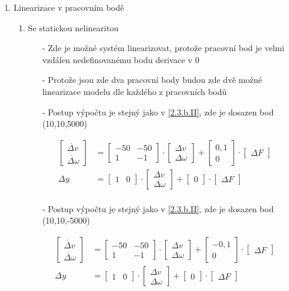\documentclass{article}
\newcommand\mat[1]{\begin{bmatrix}#1\end{bmatrix}}
\begin{document}
\begin{enumerate}
\begin{enumerate}
        \item Linearizace v pracovním bodě
            \begin{enumerate}
                \item Se statickou nelinearitou
                    \begin{itemize}
                        \item[-] Zde je možné systém linearizovat, protože pracovní bod je velmi vzdálen nedefinovanému bodu derivace v 0
                        \item[-] Protože jsou zde dva pracovní body budou zde dvě možné linearizace modelu dle každého z pracovních bodů
                        \item[-] Postup výpočtu je stejný jako v \underline{\ref{2.3.b.II}}, zde je dosazen bod (10,10,5000)
                    \end{itemize}
                    
                    \begin{align*}
                        \mat{\dot{\Delta v}\\ \dot{\Delta \omega}} &= \mat{-50 & -50\\ 1 & -1} \cdot \mat{\Delta v\\ \Delta \omega} + \mat{0,1\\ 0} \cdot \mat{\Delta F}\\
                        \Delta y &= \mat{1 & 0} \cdot \mat{\Delta v\\ \Delta \omega} + \mat{0} \cdot \mat{\Delta F}\\
                    \end{align*}

                    \newpage
                    
                    \begin{itemize}
                        \item[-] Postup výpočtu je stejný jako v \underline{\ref{2.3.b.II}}, zde je dosazen bod (10,10,-5000)
                    \end{itemize}
                
                    \begin{align*}
                        \mat{\dot{\Delta v}\\ \dot{\Delta \omega}} &= \mat{-50 & -50\\ 1 & -1} \cdot \mat{\Delta v\\ \Delta \omega} + \mat{-0,1\\ 0} \cdot \mat{\Delta F}\\
                        \Delta y &= \mat{1 & 0} \cdot \mat{\Delta v\\ \Delta \omega} + \mat{0} \cdot \mat{\Delta F}\\
                    \end{align*}
                

\end{enumerate}
\end{enumerate}
\end{enumerate}
\end{document}
